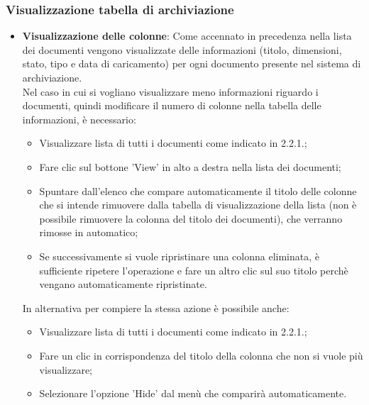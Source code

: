 \documentclass[10pt, a4paper]{article}
\begin{document}
\subsubsection{Visualizzazione tabella di archiviazione}
\begin{itemize}

\item \textbf{Visualizzazione delle colonne}: Come accennato in precedenza nella lista dei documenti vengono visualizzate delle informazioni (titolo, dimensioni, stato, tipo e data di caricamento) per ogni documento presente nel sistema di archiviazione.\\ Nel caso in cui si vogliano visualizzare meno informazioni riguardo i documenti, quindi modificare il numero di colonne nella tabella delle informazioni, è necessario:
\begin{itemize}
    \item Visualizzare lista di tutti i documenti come indicato in 2.2.1.;
    \item Fare clic sul bottone 'View' in alto a destra nella lista dei documenti;
    \item Spuntare dall'elenco che compare automaticamente il titolo delle colonne che si intende rimuovere dalla tabella di visualizzazione della lista (non è possibile rimuovere la colonna del titolo dei documenti), che verranno rimosse in automatico;
    \item Se successivamente si vuole ripristinare una colonna eliminata, è sufficiente ripetere l'operazione e fare un altro clic sul suo titolo perchè vengano automaticamente ripristinate.
\end{itemize}
In alternativa per compiere la stessa azione è possibile anche:
\begin{itemize}
    \item  Visualizzare lista di tutti i documenti come indicato in 2.2.1.;
    \item Fare un clic in corrispondenza del titolo della colonna che non si vuole più visualizzare;
    \item Selezionare l'opzione 'Hide' dal menù che comparirà automaticamente.
\end{itemize}


\end{itemize}
\end{document}
